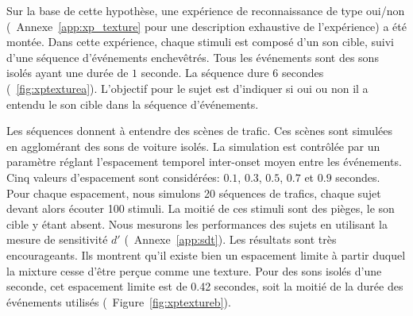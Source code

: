 Sur la base de cette hypothèse, une expérience de reconnaissance de type oui/non (\Cf~Annexe~\ref{app:xp_texture} pour une description exhaustive de l'expérience) a été montée. Dans cette expérience, chaque stimuli est composé d'un son cible, suivi d'une séquence d'événements enchevêtrés. Tous les événements sont des sons isolés ayant une durée de $1$ seconde. La séquence dure 6 secondes (\Cf~\ref{fig:xptexturea}). L'objectif pour le sujet est d'indiquer si oui ou non il a entendu le son cible dans la séquence d’événements.

Les séquences donnent à entendre des scènes de trafic. Ces scènes sont simulées en agglomérant des sons de voiture isolés. La simulation est contrôlée par un paramètre réglant l'espacement temporel inter-onset moyen entre les événements. Cinq valeurs d'espacement sont considérées: $0.1$, $0.3$, $0.5$, $0.7$ et $0.9$ secondes. Pour chaque espacement, nous simulons 20 séquences de trafics, chaque sujet devant alors écouter 100 stimuli. La moitié de ces stimuli sont des pièges, le son cible y étant absent. Nous mesurons les performances des sujets en utilisant la mesure de sensitivité $d'$ (\Cf~Annexe~\ref{app:sdt}). Les résultats sont très encourageants. Ils montrent qu'il existe bien un espacement limite à partir duquel la mixture cesse d'être perçue comme une texture. Pour des sons isolés d'une seconde, cet espacement limite est de 0.42 secondes, soit la moitié de la durée des événements utilisés (\Cf~Figure~\ref{fig:xptextureb}).






